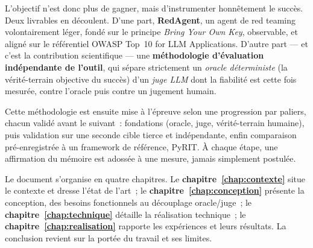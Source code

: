 L'objectif n'est donc plus de gagner, mais d'instrumenter honnêtement le succès. Deux livrables en découlent. D'une part, \textbf{RedAgent}, un agent de red teaming volontairement léger, fondé sur le principe \emph{Bring Your Own Key}, observable, et aligné sur le référentiel OWASP Top~10 for LLM Applications. D'autre part — et c'est la contribution scientifique — une \textbf{méthodologie d'évaluation indépendante de l'outil}, qui sépare strictement un \emph{oracle déterministe} (la vérité-terrain objective du succès) d'un \emph{juge LLM} dont la fiabilité est cette fois mesurée, contre l'oracle puis contre un jugement humain.

Cette méthodologie est ensuite mise à l'épreuve selon une progression par paliers, chacun validé avant le suivant~: fondations (oracle, juge, vérité-terrain humaine), puis validation sur une seconde cible tierce et indépendante, enfin comparaison pré-enregistrée à un framework de référence, PyRIT. À chaque étape, une affirmation du mémoire est adossée à une mesure, jamais simplement postulée.

Le document s'organise en quatre chapitres. Le \textbf{chapitre~\ref*{chap:contexte}} situe le contexte et dresse l'état de l'art~; le \textbf{chapitre~\ref*{chap:conception}} présente la conception, des besoins fonctionnels au découplage oracle/juge~; le \textbf{chapitre~\ref*{chap:technique}} détaille la réalisation technique~; le \textbf{chapitre~\ref*{chap:realisation}} rapporte les expériences et leurs résultats. La conclusion revient sur la portée du travail et ses limites.
